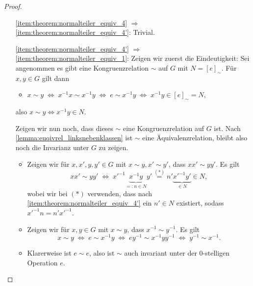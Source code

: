 \begin{proof}{\ }
\begin{itemize}[topsep=0cm, leftmargin=2.2cm]
        \item[\ref*{item:theorem:normalteiler_equiv_4} $\Rightarrow$ \ref*{item:theorem:normalteiler_equiv_4'}:] 
        Trivial.
        
        \item[\ref*{item:theorem:normalteiler_equiv_4'} $\Rightarrow$ \ref*{item:theorem:normalteiler_equiv_1}:]  
        Zeigen wir zuerst die Eindeutigkeit: Sei angenommen es gibt eine Kongruenzrelation $\sim$ auf $G$ mit $N = [e]_\sim$. Für $x, y\in G$ gilt dann 
        \begin{itemize}
            \item $x \sim y \;\Leftrightarrow\; x^{-1}x \sim x^{-1}y \; \Leftrightarrow\; e \sim x^{-1}y \;\Leftrightarrow\; x^{-1}y \in [e]_\sim = N$,
        \end{itemize}
        also $x \sim y \Leftrightarrow x^{-1}y \in N$. 
        
        Zeigen wir nun noch, dass dieses $\sim$ eine Kongruenzrelation auf $G$ ist. Nach \cref{lemma:euqivrel_linksnebenklassen} ist $\sim$ eine Äquivalenzrelation, bleibt also noch die Invarianz unter $G$ zu zeigen. 
        \begin{itemize}
            \item Zeigen wir für $x,x',y,y' \in G$ mit $x \sim y, x' \sim y'$, dass $xx'\sim yy'$. Es gilt 
            $$ xx'\sim yy' \;\Leftrightarrow\; x'^{-1}\underbrace{x^{-1}y}_{=: n \in N} y' \overset{(*)}{=} n'\underbrace{x'^{-1}y'}_{\in N} \in N, $$
            wobei wir bei $(*)$ verwenden, dass nach \ref*{item:theorem:normalteiler_equiv_4'} ein $n' \in N$ existiert, sodass $x'^{-1} n = n' x'^{-1}$.
            \item Zeigen wir für $x,y \in G$ mit $x \sim y$, dass $x^{-1} \sim y^{-1}$. Es gilt
            $$ x\sim y \;\Leftrightarrow\; e \sim x^{-1}y \;\Leftrightarrow\; ey^{-1} \sim x^{-1} y y^{-1} \;\Leftrightarrow\; y^{-1} \sim x^{-1}.$$ 
            \item Klarerweise ist $e \sim e$, also ist $\sim$ auch invariant unter der 0-stelligen Operation $e$.
        \end{itemize}
    \end{itemize}
\end{proof}

